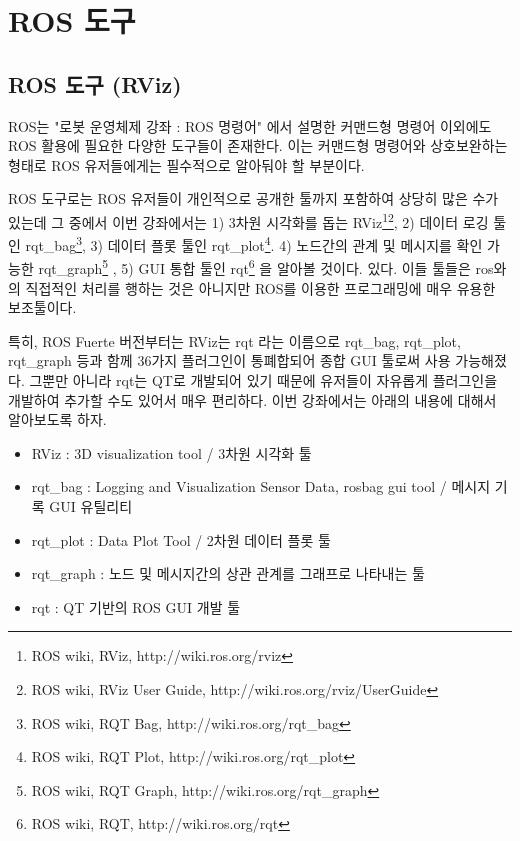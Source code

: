 
\chapter{ROS 도구}

\section{ROS 도구 (RViz)}

ROS는 "로봇 운영체제 강좌 : ROS 명령어" 에서 설명한 커맨드형 명령어 이외에도 ROS 활용에 필요한 다양한 도구들이 존재한다. 이는 커맨드형 명령어와 상호보완하는 형태로 ROS 유저들에게는 필수적으로 알아둬야 할 부분이다.

ROS 도구로는 ROS 유저들이 개인적으로 공개한 툴까지 포함하여 상당히 많은 수가 있는데 그 중에서 이번 강좌에서는 1) 3차원 시각화를 돕는 RViz\footnote{ROS wiki, RViz, http://wiki.ros.org/rviz}\footnote{ROS wiki, RViz User Guide, http://wiki.ros.org/rviz/UserGuide}, 2) 데이터 로깅 툴인 rqt\_bag\footnote{ROS wiki, RQT Bag, http://wiki.ros.org/rqt\_bag}, 3) 데이터 플롯 툴인 rqt\_plot\footnote{ROS wiki, RQT Plot, http://wiki.ros.org/rqt\_plot}. 4) 노드간의 관계 및 메시지를 확인 가능한 rqt\_graph\footnote{ROS wiki, RQT Graph, http://wiki.ros.org/rqt\_graph} , 5) GUI 통합 툴인 rqt\footnote{ROS wiki, RQT, http://wiki.ros.org/rqt} 을 알아볼 것이다. 있다. 이들 툴들은 ros와의 직접적인 처리를 행하는 것은 아니지만 ROS를 이용한 프로그래밍에 매우 유용한 보조툴이다. 

특히, ROS Fuerte 버전부터는 RViz는 rqt 라는 이름으로 rqt\_bag, rqt\_plot, rqt\_graph 등과 함께 36가지 플러그인이 통폐합되어 종합 GUI 툴로써 사용 가능해졌다. 그뿐만 아니라 rqt는 QT로 개발되어 있기 때문에 유저들이 자유롭게 플러그인을 개발하여 추가할 수도 있어서 매우 편리하다. 이번 강좌에서는 아래의 내용에 대해서 알아보도록 하자.

\begin{itemize}[leftmargin=*]
\item RViz : 3D visualization tool / 3차원 시각화 툴
\item rqt\_bag : Logging and Visualization Sensor Data, rosbag gui tool / 메시지 기록 GUI 유틸리티
\item rqt\_plot : Data Plot Tool / 2차원 데이터 플롯 툴 
\item rqt\_graph : 노드 및 메시지간의 상관 관계를 그래프로 나타내는 툴
\item rqt : QT 기반의 ROS GUI 개발 툴
\end{itemize}

